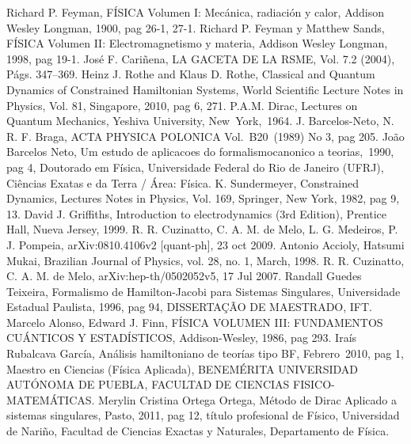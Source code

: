 \documentclass[a4paper,12pt]{article}
\begin{document}
\begin{thebibliography}{99}
 Richard P. Feyman, FÍSICA Volumen I: Mecánica, radiación y calor, Addison Wesley Longman, 1900, pag 26-1, 27-1.
 Richard P. Feyman y Matthew Sands, FÍSICA Volumen II: Electromagnetismo y materia, Addison Wesley Longman, 1998, pag 19-1.
 José F. Cariñena, LA GACETA DE LA RSME, Vol. 7.2 (2004), Págs. 347–369. 
 Heinz J. Rothe and Klaus D. Rothe, Classical and Quantum Dynamics of
Constrained Hamiltonian Systems, World Scientific Lecture Notes in Physics, Vol. 81, Singapore, 2010, pag 6, 271.
 P.A.M. Dirac, Lectures on Quantum Mechanics, Yeshiva University, \mbox{New York, 1964.}
 J. Barcelos-Neto, N. R. F. Braga, ACTA PHYSICA POLONICA \mbox{Vol. B20 (1989)} No 3, pag 205.
 João Barcelos Neto, Um estudo de aplicacoes do formalismocanonico a \mbox{teorias, 1990,} pag 4, Doutorado em Física, Universidade Federal do Rio de Janeiro (UFRJ), Ciências Exatas e da Terra / Área: Física. 
 K. Sundermeyer, Constrained Dynamics, Lectures Notes in Physics, Vol. 169,
Springer, New York, 1982, pag 9, 13.
 David J. Griffiths, Introduction to electrodynamics (3rd Edition), Prentice Hall,  Nueva Jersey, 1999.
 R. R. Cuzinatto, C. A. M. de Melo, L. G. Medeiros, P. J. Pompeia, arXiv:0810.4106v2 [quant-ph], 23 oct 2009.
 Antonio Accioly, Hatsumi Mukai, Brazilian Journal of Physics, vol. 28, no. 1, March, 1998.
 R. R. Cuzinatto, C. A. M. de Melo, arXiv:hep-th/0502052v5, 17 Jul 2007.
 Randall Guedes Teixeira, Formalismo de Hamilton-Jacobi para Sistemas Singulares, Universidade Estadual Paulista, 1996, pag 94, DISSERTA\c{C}\~{A}O DE MAESTRADO, IFT. 
 Marcelo Alonso, Edward J. Finn, FÍSICA VOLUMEN III: FUNDAMENTOS CUÁNTICOS Y ESTADÍSTICOS, Addison-Wesley, 1986, pag 293.
 Iraís Rubalcava García, Análisis hamiltoniano de teorías tipo BF, \mbox{Febrero 2010,} pag 1, Maestro en Ciencias (Física Aplicada), BENEMÉRITA \mbox{UNIVERSIDAD} AUTÓNOMA DE PUEBLA, FACULTAD DE CIENCIAS FISICO-MATEMÁTICAS.
 Merylin Cristina Ortega Ortega, Método de Dirac \mbox{Aplicado} a sistemas singulares, Pasto, 2011, pag 12, título profesional de Físico, Universidad de Nariño, Facultad de Ciencias Exactas y Naturales, Departamento de Física.




\end{thebibliography}
\end{document}
